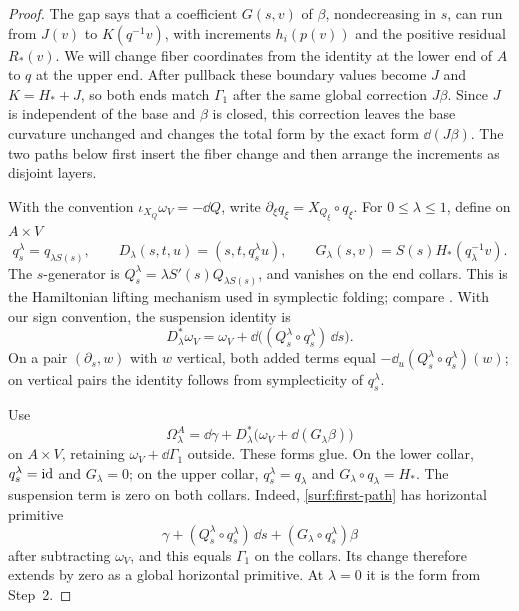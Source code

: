 \begin{proof}
The gap says that a coefficient $G(s,v)$ of $\beta$, nondecreasing in $s$,
can run from $J(v)$ to $K(q^{-1}v)$, with increments
$h_i(p(v))$ and the positive residual $R_*(v)$.
We will change fiber coordinates from the identity at the lower end
of $A$ to $q$ at the upper end. After pullback these boundary values
become $J$ and $K=H_*+J$, so both ends match $\Gamma_1$ after the
same global correction $J\beta$. Since $J$ is independent of the
base and $\beta$ is closed, this correction leaves the base curvature
unchanged and changes the total form by the exact form $\dd(J\beta)$.
The two paths below first insert the fiber change and then arrange
the increments as disjoint layers.

With the convention $\iota_{X_Q}\omega_V=-\dd Q$, write
$\partial_\xi q_\xi=X_{Q_\xi}\circ q_\xi$.
For $0\leq\lambda\leq1$, define on $A\times V$
\[
 q_s^\lambda=q_{\lambda S(s)},\qquad
 D_\lambda(s,t,u)=(s,t,q_s^\lambda u),\qquad
 G_\lambda(s,v)=S(s)H_*(q_\lambda^{-1}v).
\]
The $s$-generator is
$Q_s^\lambda=\lambda S'(s)Q_{\lambda S(s)}$, and vanishes on
the end collars. This is the Hamiltonian lifting mechanism used in
symplectic folding; compare \cite[Section~3.1, Step~3]{SchlenkFolding}.
With our sign convention, the suspension identity is
\begin{equation}\label{surf:suspension}
 D_\lambda^*\omega_V
   =\omega_V+\dd\bigl((Q_s^\lambda\circ q_s^\lambda)\,\dd s\bigr).
\end{equation}
On a pair $(\partial_s,w)$ with $w$ vertical, both added terms
equal $-\dd_u(Q_s^\lambda\circ q_s^\lambda)(w)$; on vertical
pairs the identity follows from symplecticity of $q_s^\lambda$.

Use
\begin{equation}\label{surf:first-path}
 \Omega_\lambda^A
   =\dd\gamma+
       D_\lambda^*\bigl(\omega_V+\dd(G_\lambda\beta)\bigr)
\end{equation}
on $A\times V$, retaining $\omega_V+\dd\Gamma_1$ outside.
These forms glue.  On the lower collar, $q_s^\lambda=\mathrm{id}$ and
$G_\lambda=0$; on the upper collar, $q_s^\lambda=q_\lambda$ and
$G_\lambda\circ q_\lambda=H_*$.  The suspension term is zero
on both collars.
Indeed, \eqref{surf:first-path} has horizontal primitive
\[
 \gamma+(Q_s^\lambda\circ q_s^\lambda)\,\dd s
             +(G_\lambda\circ q_s^\lambda)\beta
\]
after subtracting $\omega_V$, and this equals $\Gamma_1$ on the
collars.  Its change therefore extends by zero as a global
horizontal primitive.  At $\lambda=0$ it is the form from Step~2.


\end{proof}
